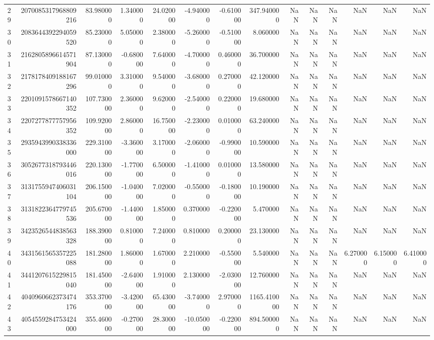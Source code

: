 \begin{tabular}{lrrrrrrrrrrrrr}
29 & 2070085317968809216 & 83.980000 & 1.340000 & 24.020000 & -4.940000 & -0.610000 & 347.940000 & NaN & NaN & NaN & NaN & NaN & NaN \\
30 & 2083644392294059520 & 85.230000 & 5.050000 & 2.380000 & -5.260000 & -0.510000 & 8.060000 & NaN & NaN & NaN & NaN & NaN & NaN \\
31 & 2162805896614571904 & 87.130000 & -0.680000 & 7.640000 & -4.700000 & 0.460000 & 36.700000 & NaN & NaN & NaN & NaN & NaN & NaN \\
32 & 2178178409188167296 & 99.010000 & 3.310000 & 9.540000 & -3.680000 & 0.270000 & 42.120000 & NaN & NaN & NaN & NaN & NaN & NaN \\
33 & 2201091578667140352 & 107.730000 & 2.360000 & 9.620000 & -2.540000 & 0.220000 & 19.680000 & NaN & NaN & NaN & NaN & NaN & NaN \\
34 & 2207277877757956352 & 109.920000 & 2.860000 & 16.750000 & -2.230000 & 0.010000 & 63.240000 & NaN & NaN & NaN & NaN & NaN & NaN \\
35 & 2935943990338336000 & 229.310000 & -3.360000 & 3.170000 & -2.060000 & -0.990000 & 10.590000 & NaN & NaN & NaN & NaN & NaN & NaN \\
36 & 3052677318793446016 & 220.130000 & -1.770000 & 6.500000 & -1.410000 & 0.010000 & 13.580000 & NaN & NaN & NaN & NaN & NaN & NaN \\
37 & 3131755947406031104 & 206.150000 & -1.040000 & 7.020000 & -0.550000 & -0.180000 & 10.190000 & NaN & NaN & NaN & NaN & NaN & NaN \\
38 & 3131822364779745536 & 205.670000 & -1.440000 & 1.850000 & 0.370000 & -0.220000 & 5.470000 & NaN & NaN & NaN & NaN & NaN & NaN \\
39 & 3423526544838563328 & 188.390000 & 0.810000 & 7.240000 & 0.810000 & 0.200000 & 23.130000 & NaN & NaN & NaN & NaN & NaN & NaN \\
40 & 3431561565357225088 & 181.280000 & 1.860000 & 1.670000 & 2.210000 & -0.550000 & 5.540000 & NaN & NaN & NaN & 6.270000 & 6.150000 & 6.410000 \\
41 & 3441207615229815040 & 181.450000 & -2.640000 & 1.910000 & 2.130000 & -2.030000 & 12.760000 & NaN & NaN & NaN & NaN & NaN & NaN \\
42 & 4040960662373474176 & 353.370000 & -3.420000 & 65.430000 & -3.740000 & 2.970000 & 1165.410000 & NaN & NaN & NaN & NaN & NaN & NaN \\
43 & 4054559284753424000 & 355.460000 & -0.270000 & 28.300000 & -10.050000 & -0.220000 & 894.500000 & NaN & NaN & NaN & NaN & NaN & NaN \\

\end{tabular}
